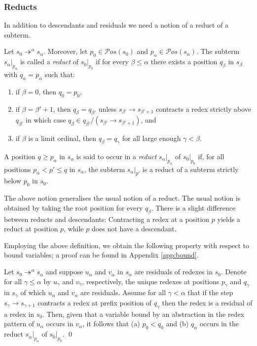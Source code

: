 \documentclass{LMCS}
\theoremstyle{plain}
\theoremstyle{definition}
\newcommand{\rew}{\rightarrow}
\newcommand{\trewt}{\twoheadrightarrow}
\newcommand{\pos}[1]{\mathcal{P}os(#1)}
\begin{document}
\subsubsection{Reducts}

In addition to descendants and residuals we need a notion of a reduct of a subterm.
\begin{defi}
Let $s_0 \trewt^\alpha s_\alpha$. Moreover, let $p_0 \in \pos{s_0}$ and $p_\alpha \in \pos{s_\alpha}$. The subterm $s_{\alpha}|_{p_\alpha}$ is called a \emph{reduct} of $s_0|_{p_0}$ if for every $\beta \leq \alpha$ there exists a position $q_\beta$ in $s_\beta$ with $q_\alpha = p_\alpha$ such that:
\begin{enumerate}[$\bullet$]
\item
if $\beta = 0$, then $q_0 = p_0$,
\item
if $\beta = \beta' + 1$, then $q_\beta = q_{\beta'}$ unless $s_{\beta'} \rew s_{\beta' + 1}$ contracts a redex strictly above $q_{\beta'}$ in which case $q_\beta \in q_{\beta'} / (s_{\beta'} \rew s_{\beta' + 1})$, and
\item
if $\beta$ is a limit ordinal, then $q_\beta = q_\gamma$ for all large enough $\gamma < \beta$.
\end{enumerate}

A position $q \geq p_\alpha$ in $s_\alpha$ is said to occur in a \emph{reduct} $s_\alpha|_{p_\alpha}$ of $s_0|_{p_0}$ if, for all positions $p_\alpha < p' \leq q$
in $s_\alpha$, the subterm $s_\alpha\vert_{p'}$ is a reduct
of a subterm strictly below $p_0$ in $s_0$.
\end{defi}

The above notion generalises the usual notion of a reduct. The usual notion is obtained by taking the root position for every $q_\beta$. There is a slight difference between reducts and descendants: Contracting a redex at a position $p$ yields a reduct at position $p$, while $p$ does not have a descendant.

Employing the above definition, we obtain the following property with respect to bound variables; a proof can be found in Appendix \ref{app:bound}.

\begin{lem}
\label{lem:funky_bind}
Let $s_0 \trewt^\alpha s_\alpha$ and suppose $u_\alpha$ and $v_\alpha$ in $s_\alpha$ are residuals of redexes in $s_0$. Denote for all $\gamma \leq \alpha$  by $u_\gamma$ and $v_\gamma$, respectively, the unique redexes at positions $p_\gamma$ and $q_\gamma$ in $s_\gamma$ of which $u_\alpha$ and $v_\alpha$ are residuals.
Assume for all $\gamma < \alpha$ that if the step $s_\gamma \rew s_{\gamma + 1}$ contracts a redex at prefix position of $q_\gamma$ then the redex is a residual of a redex in $s_0$. Then, given that a variable bound by an abstraction in the redex pattern of $u_\alpha$ occurs in $v_\alpha$, it follows that (a) $p_0 < q_0$ and (b) $q_\alpha$ occurs in the reduct $s_\alpha|_{p_\alpha}$ of $s_0|_{p_0}$. \qed
\end{lem}
\end{document}
